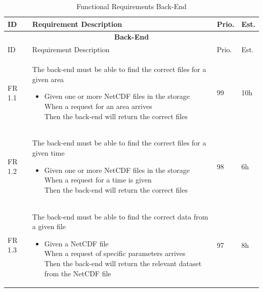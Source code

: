 \documentclass[11pt,a4paper,titlepage,oneside]{report}
\begin{document}
  \begin{longtable}{p{1.4cm} p{7.8cm} p{1cm} p{1cm} }
  \caption[]{Functional Requirements Back-End}\\
  \multicolumn{1}{p{1.4cm}}{ID} &
  \multicolumn{1}{p{7.8cm}}{Requirement Description} &
  \multicolumn{1}{p{1cm}}{Prio.} &
  \multicolumn{1}{p{1cm}}{Est.}
  \endhead

  \caption[Functional Requirements Back-End]{} \label{funcReqsBack} \\
  \hline \multicolumn{4}{c}{\textbf{Back-End}} \\
  \hline
  \multicolumn{1}{p{1.4cm}}{ID} &
  \multicolumn{1}{p{7.8cm}}{Requirement Description} &
  \multicolumn{1}{p{1cm}}{Prio.} &
  \multicolumn{1}{p{1cm}}{Est.}
  \endfirsthead
  
  \hline
  \multicolumn{4}{r}{{Continued on next page}} \\
  \endfoot

  \hline \hline
  \endlastfoot

  \hline  
  FR 1.1 & The back-end must be able to find the correct files for a given area
  
  \begin{itemize}
  \item \parbox[t]{6.8cm}{
        Given one or more NetCDF files in the storage \\ 
        When a request for an area arrives \\ 
        Then the back-end will return the correct files}
  \end{itemize}
   & 99 & 10h \\ \hline
  
  FR 1.2 & The back-end must be able to find the correct files for a given time 
  \begin{itemize}
  \item \parbox[t]{6.8cm}{
        Given one or more NetCDF files in the storage \\ 
        When a request for a time is given \\ 
        Then the back-end will return the correct files}
  \end{itemize}
  & 98 & 6h \\ \hline %

  FR 1.3 & The back-end must be able to find the correct data from a given file 
  \begin{itemize}
  \item \parbox[t]{6.8cm}{
        Given a NetCDF file \\ 
        When a request of specific parameters arrives \\ 
        Then the back-end will return the relevant dataset from the NetCDF file}
  \end{itemize}
  & 97 & 8h \\ \hline


\end{longtable}
\end{document}

